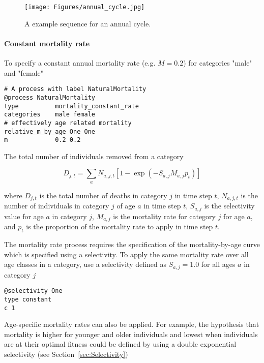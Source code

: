 \begin{figure}[H]
	\centering
	\texttt{[image: Figures/annual\_cycle.jpg]}
	\caption{A example sequence for an annual cycle.}\label{Fig:annual2}
\end{figure}



\paragraph{Constant mortality rate}\label{sec:Process-MortalityConstantRate} 

To specify a constant annual mortality rate (e.g. $M=0.2$) for categories "male" and "female"

{\small{\begin{verbatim}
# A process with label NaturalMortality
@process NaturalMortality
type          mortality_constant_rate
categories    male female
# effectively age related mortality
relative_m_by_age One One
m             0.2 0.2
\end{verbatim}}}

The total number of individuals removed from a category

\begin{equation}
D_{j,t} = \sum_a N_{a,j,t} [1 - \exp(-S_{a,j} M_{a,j} p_t)]
\end{equation}

where $D_{j,t}$ is the total number of deaths in category $j$ in time step $t$, $N_{a,j,t}$ is the number of individuals in category $j$ of age $a$ in time step $t$, $S_{a,j}$ is the selectivity value for age $a$ in category $j$, $M_{a,j}$ is the mortality rate for category $j$ for age $a$, and $p_t$ is the proportion of the mortality rate to apply in time step $t$.

The mortality rate process requires the specification of the mortality-by-age curve which is specified using a selectivity. To apply the same mortality rate over all age classes in a category, use a selectivity defined as $S_{a,j}=1.0$ for all ages $a$ in category $j$

{\small{\begin{verbatim}
@selectivity One
type constant
c 1
\end{verbatim}}}

Age-specific mortality rates can also be applied. For example, the hypothesis that mortality is higher for younger and older individuals and lowest when individuals are at their optimal fitness could be defined by using a double exponential selectivity (see Section~\ref{sec:Selectivity})

